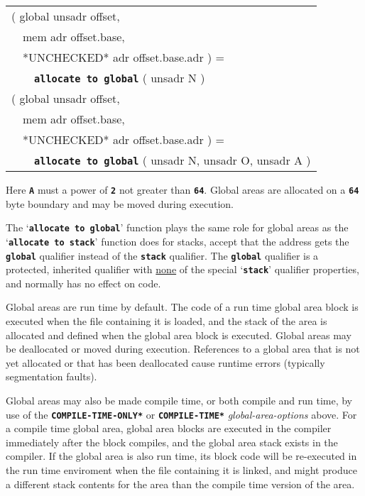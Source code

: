 \documentclass[12pt]{article}
\makeatletter
\newcommand{\TT}[1]{{\tt \bfseries #1}}
\newcommand{\ttkey}[1]{\TT{#1}\index{#1@{\tt #1}}}
\newcommand{\EOL}{\penalty \exhyphenpenalty}
\newenvironment{indpar}[1][0.3in]%
	{\begin{list}{}%
		     {\setlength{\itemsep}{0in}%
		      \setlength{\topsep}{0in}%
		      \setlength{\parsep}{1ex}%
		      \setlength{\labelwidth}{#1}%
		      \setlength{\leftmargin}{#1}%
		      \addtolength{\leftmargin}{\labelsep}}%
	 \item}%
	{\end{list}}
\makeatother
\begin{document}
\begin{indpar}\tt\begin{tabular}{l}
( global unsadr offset, \\
~~mem adr offset.base, \\
~~*UNCHECKED* adr offset.base.adr  ) = \\
~~~~\ttkey{allocate to global} ( unsadr N ) \\[1ex]
( global unsadr offset, \\
~~mem adr offset.base, \\
~~*UNCHECKED* adr offset.base.adr  ) = \\
~~~~\ttkey{allocate to global} ( unsadr N, unsadr O, unsadr A ) \\
\end{tabular}\end{indpar}\label{ALLOCATE-TO-GLOBAL}

Here \TT{A} must a power of \TT{2} not greater than \TT{64}.
Global areas are allocated on a \TT{64} byte boundary and
may be moved during execution.

The `\TT{allocate to global}' function plays the same role for
global areas as the `\TT{allocate to stack}' function does for
stacks, accept that the address gets the \TT{global} qualifier
instead of the \TT{stack} qualifier.  The \TT{global} qualifier
is a protected, inherited qualifier
with \underline{none} of the special `\TT{stack}'
qualifier properties, and normally has no effect on code.

Global areas are run time by default.
The code of a run time
global area block is executed when the file containing it is
loaded, and the stack of the area is allocated and defined when
the global area block is executed.
Global areas may be deallocated or moved during execution.
References to a global area
that is not yet allocated or that has been deallocated cause runtime
errors (typically segmentation faults).

Global areas may also be made compile time, or both compile and run time,
by use of the \TT{*COM\-PILE-\EOL TIME-\EOL ONLY*} or \TT{*COMPILE-\EOL TIME*}
{\em global-\EOL area-\EOL options} above.  For a compile time
global area, global area blocks are executed in the compiler immediately
after the block compiles, and the global area stack exists in the compiler.
If the global area is also run time, its
block code will be re-executed in the run time enviroment when the
file containing it is linked, and might produce a different stack contents
for the area than the compile time version of the area.
\end{document}
